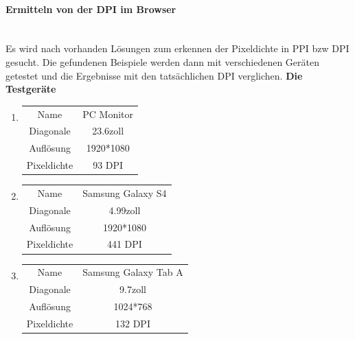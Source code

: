 \paragraph{Ermitteln von der DPI im Browser}
\mbox{}\\
Es wird nach vorhanden Lösungen zum erkennen der Pixeldichte in PPI bzw DPI gesucht.
Die gefundenen Beispiele werden dann mit verschiedenen Geräten getestet und die Ergebnisse mit den tatsächlichen DPI verglichen.
\newline\textbf{Die Testgeräte}
\begin{enumerate}
	\item \begin{tabular}{cc}
	      Name & PC Monitor\\
	      Diagonale & 23.6zoll\\
	      Auflösung & 1920*1080\\
	      Pixeldichte & 93 DPI\\
	\end{tabular}
	\item \begin{tabular}{cc}
	      Name & Samsung Galaxy S4\\
	      Diagonale & 4.99zoll\\
	      Auflösung & 1920*1080\\
	      Pixeldichte & 441 DPI\\
	\end{tabular}
	\item \begin{tabular}{cc}
	      Name & Samsung Galaxy Tab A\\
	      Diagonale & 9.7zoll\\
	      Auflösung & 1024*768\\
	      Pixeldichte & 132 DPI\\
	\end{tabular}
\end{enumerate}
\newpage
